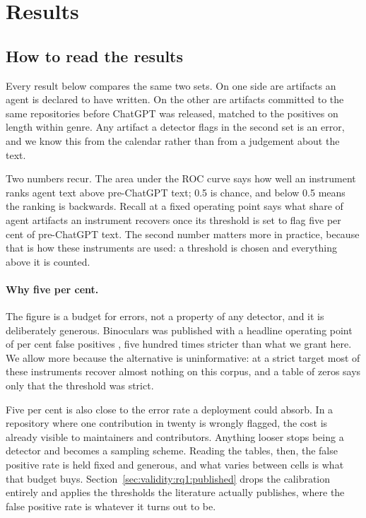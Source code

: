 \section{Results}
\label{sec:validity}

\subsection{How to read the results}
\label{sec:validity:howto}

Every result below compares the same two sets. On one side are artifacts an agent is
declared to have written. On the other are artifacts committed to the same repositories
before ChatGPT was released, matched to the positives on length within genre. Any
artifact a detector flags in the second set is an error, and we know this from the
calendar rather than from a judgement about the text.

Two numbers recur. The area under the ROC curve says how well an instrument ranks agent
text above pre-ChatGPT text; 0.5 is chance, and below 0.5 means the ranking is
backwards. Recall at a fixed operating point says what share of agent artifacts an
instrument recovers once its threshold is set to flag five per cent of pre-ChatGPT text.
The second number matters more in practice, because that is how these instruments are
used: a threshold is chosen and everything above it is counted.

\paragraph{Why five per cent.} The figure is a budget for errors, not a property of any
detector, and it is deliberately generous. Binoculars was published with a headline
operating point of  per cent false positives \citep{hans2024binoculars},
five hundred times stricter than what we grant here. We allow more because the
alternative is uninformative: at a strict target most of these instruments recover
almost nothing on this corpus, and a table of zeros says only that the threshold was
strict.

Five per cent is also close to the error rate a deployment could absorb. In a repository
where one contribution in twenty is wrongly flagged, the cost is already visible to
maintainers and contributors. Anything looser stops being a detector and becomes a
sampling scheme. Reading the tables, then, the false positive rate is held fixed and
generous, and what varies between cells is what that budget buys.
Section~\ref{sec:validity:rq1:published} drops the calibration entirely and applies the
thresholds the literature actually publishes, where the false positive rate is whatever
it turns out to be.

